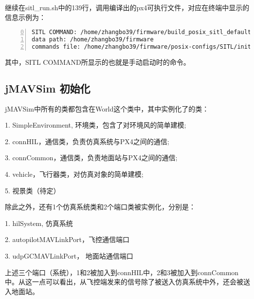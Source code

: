 继续在sitl_run.sh中的139行，调用编译出的px4可执行文件，对应在终端中显示的信息示例为：
\begin{lstlisting}[language=bash,numbers=left,firstnumber = 0,breaklines = true,numberstyle=\tiny,keywordstyle=\color{blue!70},commentstyle=\color{red!50!green!50!blue!50},frame=shadowbox, rulesepcolor=\color{red!20!green!20!blue!20}]
SITL COMMAND: /home/zhangbo39/firmware/build_posix_sitl_default/src/firmware/posix/px4 /home/zhangbo39/firmware /home/zhangbo39/firmware/posix-configs/SITL/init/lpe/iris
data path: /home/zhangbo39/firmware
commands file: /home/zhangbo39/firmware/posix-configs/SITL/init/lpe/iris
\end{lstlisting}
其中，SITL COMMAND所显示的也就是手动启动时的命令。

\subsection{jMAVSim 初始化}
jMAVSim中所有的类都包含在World这个类中，其中实例化了的类：

1. SimpleEnvironment, 环境类，包含了对环境风的简单建模;

2. connHIL，通信类，负责仿真系统与PX4之间的通信;

3. connCommon，通信类，负责地面站与PX4之间的通信;

4. vehicle，飞行器类，对仿真对象的简单建模;

5. 视景类（待定）

除此之外，还有1个仿真系统类和2个端口类被实例化，分别是：

1. hilSystem, 仿真系统

2. autopilotMAVLinkPort，飞控通信端口

3. udpGCMAVLinkPort， 地面站通信端口

上述三个端口（系统），1和2被加入到connHIL中，2和3被加入到connCommon中。从这一点可以看出，从飞控端发来的信号除了被送入仿真系统中外，还会被送入地面站。

